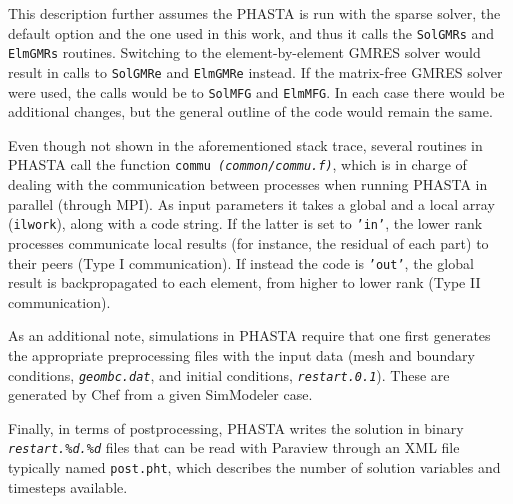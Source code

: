 \documentclass{ucb}
\begin{document}
This description further assumes the PHASTA is run with the sparse solver, the default option and the one used in this work, and thus it calls the \texttt{SolGMRs} and \texttt{ElmGMRs} routines. Switching to the element-by-element GMRES solver would result in calls to \texttt{SolGMRe} and \texttt{ElmGMRe} instead. If the matrix-free GMRES solver were used, the calls would be to \texttt{SolMFG} and \texttt{ElmMFG}. In each case there would be additional changes, but the general outline of the code would remain the same.

Even though not shown in the aforementioned stack trace, several routines in PHASTA call the function \texttt{commu \textit{(common/commu.f)}}, which is in charge of dealing with the communication between processes when running PHASTA in parallel (through MPI). As input parameters it takes a global and a local array (\texttt{ilwork}), along with a code string. If the latter is set to \texttt{'in'}, the lower rank processes communicate local results (for instance, the residual of each part) to their peers (Type I communication). If instead the code is \texttt{'out'}, the global result is backpropagated to each element, from higher to lower rank (Type II communication).

As an additional note, simulations in PHASTA require that one first generates the appropriate preprocessing files with the input data (mesh and boundary conditions, \texttt{\textit{geombc.dat}}, and initial conditions, \texttt{\textit{restart.0.1}}). These are generated by Chef from a given SimModeler case.

Finally, in terms of postprocessing, PHASTA writes the solution in binary \texttt{\textit{restart.\%d.\%d}} files that can be read with Paraview through an XML file typically named \texttt{post.pht}, which describes the number of solution variables and timesteps available.
\end{document}
